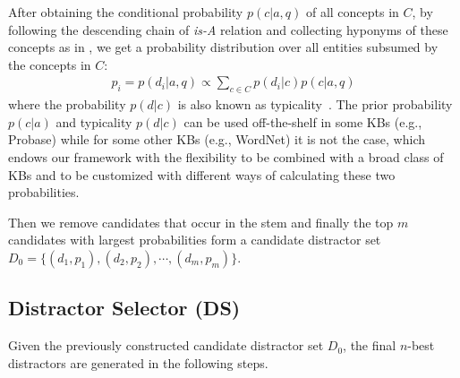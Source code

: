 After obtaining the conditional probability $p(c|a, q)$ of all concepts in 
$C$, by following the descending chain of \textit{is-A} relation and 
collecting hyponyms of these concepts as in , we get a probability distribution over 
all entities subsumed by the concepts in $C$:
\begin{align}	
	p_{i} = p(d_i|a,q) \propto \sum_{c\in C} p(d_i|c) p(c|a,q)
	\label{eq:pd}
\end{align}
where the probability $p(d|c)$ is also known as 
typicality~\cite{wu2012probase}. 
The prior probability $p(c|a)$ and typicality $p(d|c)$ can be used
off-the-shelf in some KBs (e.g., Probase) while for some other KBs
(e.g., WordNet) it is not the case, which endows our framework with 
the flexibility to be combined with a broad class of KBs and 
to be customized with different ways of calculating these two probabilities.

Then we remove candidates that occur in the stem and finally the top $m$ candidates with largest probabilities form a candidate distractor set $D_0 = \{(d_1, p_1), (d_2, p_2), \cdots,(d_m, p_m) \}$. 

\subsection{Distractor Selector (DS)}
\label{sec:DS}
Given the previously constructed candidate distractor set $D_0$, the final $n$-best distractors are generated in the following steps.

